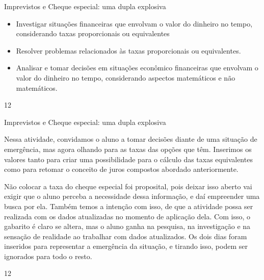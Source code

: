 \begin{objectives}{Imprevistos e Cheque especial: uma dupla explosiva}
{
\begin{itemize}
\item Investigar situações financeiras que envolvam o valor do dinheiro no tempo, considerando taxas proporcionais ou equivalentes
\item Resolver problemas relacionados às taxas proporcionais ou equivalentes.
\item Analisar e tomar decisões em situações econômico financeiras que envolvam o valor do dinheiro no tempo, considerando aspectos matemáticos e não matemáticos.
\end{itemize}
}{1}{2}
\end{objectives}
\marginpar{\vspace{-2.5em}}
\begin{sugestions}{Imprevistos e Cheque especial: uma dupla explosiva}
{
Nessa atividade, convidamos o aluno a tomar decisões diante de uma situação de emergência, mas agora olhando para as taxas das opções que têm. Inserimos os valores tanto para criar uma possibilidade para o cálculo das taxas equivalentes como para retomar o conceito de juros compostos abordado anteriormente. 

Não colocar a taxa do cheque especial foi proposital, pois deixar isso aberto vai exigir que o aluno perceba a necessidade dessa informação, e daí empreender uma busca por ela. Também temos a intenção com isso, de que a atividade possa ser realizada com os dados atualizadas no momento de aplicação dela. Com isso, o gabarito é claro se altera, mas o aluno ganha na pesquisa, na investigação e na sensação de realidade ao trabalhar com dados atualizados. 
Os dois dias foram inseridos para representar a emergência da situação, e tirando isso, podem ser ignorados para todo o resto.

}{1}{2}
\end{sugestions}

